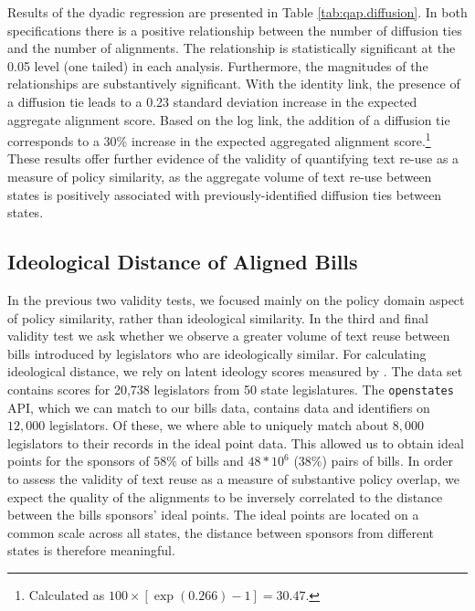 \documentclass[12pt]{article} %
\begin{document}
Results of the dyadic regression are presented in Table \ref{tab:qap.diffusion}. In both specifications there is a positive relationship between the number of diffusion ties and the number of alignments. The relationship is statistically significant at the 0.05 level (one tailed) in each analysis. Furthermore, the magnitudes of the relationships are substantively significant. With the identity link, the presence of a diffusion tie leads to a 0.23 standard deviation increase in the expected aggregate alignment score. Based on the log link, the addition of a diffusion tie corresponds to a 30\% increase in the expected aggregated alignment score.\footnote{Calculated as $100\times \left[ \exp(0.266)-1\right] = 30.47$.} These results offer further evidence of the validity of quantifying text re-use as a measure of policy similarity, as the aggregate volume of text re-use between states is positively associated with previously-identified diffusion ties between states.


\subsection{Ideological Distance of Aligned Bills}

In the previous two validity tests, we focused mainly on the policy domain
aspect of policy similarity, rather than ideological similarity. In the third
and final validity test we ask whether we observe a greater volume of text reuse
between bills introduced by legislators who are ideologically similar. For
calculating ideological distance, we rely on latent ideology scores measured by
\citep{shor2011}. The data set contains scores for 20,738 legislators from 50
state legislatures. The \texttt{openstates} API, which we can match to our bills
data, contains data and identifiers on $12,000$ legislators. Of these, we where
able to uniquely match about $8,000$ legislators to their records in the ideal
point data. This allowed us to obtain ideal points for the sponsors of $58\%$ of
bills and $48*10^6$ ($38\%$) pairs of bills. In order to assess the validity of text reuse as a measure of substantive policy overlap, we expect the quality of the alignments to be inversely correlated to the distance between the bills sponsors' ideal points. The ideal points are located on a common scale across all states, the distance between sponsors from different states is therefore meaningful. 
\end{document}
